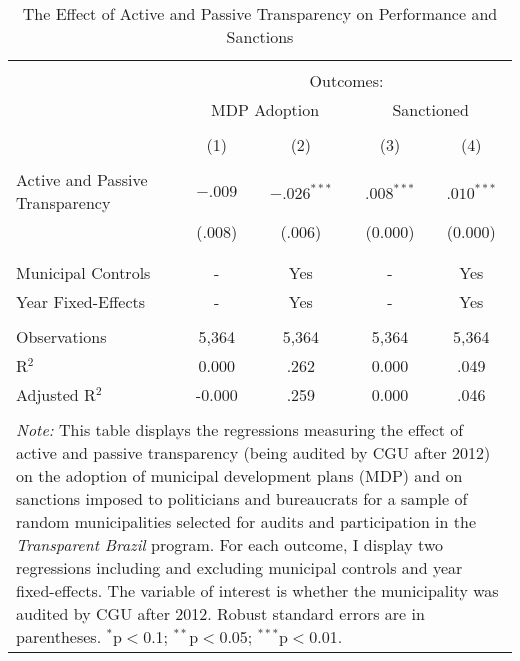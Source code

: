 
\begin{table}[!htbp] \centering
  \caption{The Effect of Active and Passive Transparency on Performance and Sanctions}
  \label{tab:performance3}
\scriptsize
\begin{tabular}{@{\extracolsep{5pt}}lcccc}
\\[-1.8ex]\hline
\hline \\[-1.8ex]
& \multicolumn{4}{c}{Outcomes:} \T \B \\
\cline{2-5}
 & \multicolumn{2}{c}{MDP Adoption} & \multicolumn{2}{c}{Sanctioned} \T \B \\
\\[-1.8ex] & \multicolumn{1}{c}{(1)} & \multicolumn{1}{c}{(2)} & \multicolumn{1}{c}{(3)} & \multicolumn{1}{c}{(4)}\\
\hline \\[-1.8ex]
 Active and Passive Transparency & $-.009$ & $-.026^{***}$ & \hspace{1pt} $.008^{***}$ & \hspace{1pt} $.010^{***}$ \\
                                 & (.008) & (.006) & (0.000) & (0.000) \\
                                 & & & & \\
\hline \\[-1.8ex]
Municipal Controls & \multicolumn{1}{c}{-} & \multicolumn{1}{c}{Yes} & \multicolumn{1}{c}{-} & \multicolumn{1}{c}{Yes} \\
Year Fixed-Effects & \multicolumn{1}{c}{-} & \multicolumn{1}{c}{Yes} & \multicolumn{1}{c}{-} & \multicolumn{1}{c}{Yes} \\
\hline \\[-1.8ex]
Observations & \multicolumn{1}{c}{5,364} & \multicolumn{1}{c}{5,364} & \multicolumn{1}{c}{5,364} & \multicolumn{1}{c}{5,364} \\
R$^{2}$ & \multicolumn{1}{c}{0.000} & \multicolumn{1}{c}{.262} & \multicolumn{1}{c}{0.000} & \multicolumn{1}{c}{.049} \\
Adjusted R$^{2}$ & \multicolumn{1}{c}{-0.000} & \multicolumn{1}{c}{.259} & \multicolumn{1}{c}{0.000} & \multicolumn{1}{c}{.046} \\
\hline
\hline \\[-1.8ex]
\multicolumn{5}{p{.65\textwidth}}{\emph{Note:} This table displays the regressions measuring the effect of active and passive transparency (being audited by CGU after 2012) on the adoption of municipal development plans (MDP) and on sanctions imposed to politicians and bureaucrats for a sample of random municipalities selected for audits and participation in the \emph{Transparent Brazil} program. For each outcome, I display two regressions including and excluding municipal controls and year fixed-effects. The variable of interest is whether the municipality was audited by CGU after 2012. Robust standard errors are in parentheses. $^{*}$p$<$0.1; $^{**}$p$<$0.05; $^{***}$p$<$0.01.}
\end{tabular}
\end{table}
